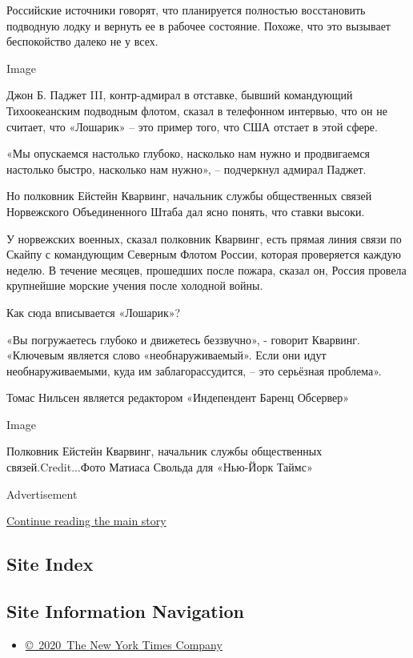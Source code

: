 Российские источники говорят, что планируется полностью восстановить
подводную лодку и вернуть ее в рабочее состояние. Похоже, что это
вызывает беспокойство далеко не у всех.

Image

Джон Б. Паджет III, контр-адмирал в отставке, бывший командующий
Тихоокеанским подводным флотом, сказал в телефонном интервью, что он не
считает, что «Лошарик» -- это пример того, что США отстает в этой сфере.

«Мы опускаемся настолько глубоко, насколько нам нужно и продвигаемся
настолько быстро, насколько нам нужно», -- подчеркнул адмирал Паджет.

Но полковник Ейстейн Кварвинг, начальник службы общественных связей
Норвежского Объединенного Штаба дал ясно понять, что ставки высоки.

У норвежских военных, сказал полковник Кварвинг, есть прямая линия связи
по Скайпу с командующим Северным Флотом России, которая проверяется
каждую неделю. В течение месяцев, прошедших после пожара, сказал он,
Россия провела крупнейшие морские учения после холодной войны.

Как сюда вписывается «Лошарик»?

«Вы погружаетесь глубоко и движетесь беззвучно», - говорит Кварвинг.
«Ключевым является слово «необнаруживаемый». Если они идут
необнаруживаемыми, куда им заблагорассудится, -- это серьёзная
проблема».

Томас Нильсен является редактором «Индепендент Баренц Обсервер»

Image

Полковник Ейстейн Кварвинг, начальник службы общественных
связей.Credit...Фото Матиаса Свольда для «Нью-Йорк Таймс»

Advertisement

\protect\hyperlink{after-bottom}{Continue reading the main story}

\hypertarget{site-index}{%
\subsection{Site Index}\label{site-index}}

\hypertarget{site-information-navigation}{%
\subsection{Site Information
Navigation}\label{site-information-navigation}}

\begin{itemize}
\tightlist
\item
  \href{https://help.nytimes.com/hc/en-us/articles/115014792127-Copyright-notice}{©~2020~The
  New York Times Company}
\end{itemize}

